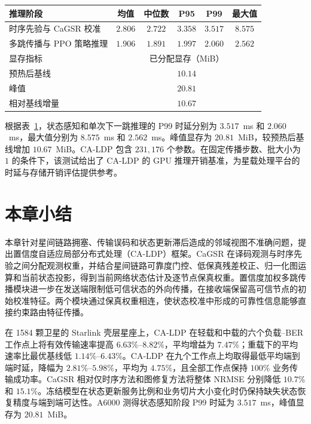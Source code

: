 \begin{table}[!htp]
\centering
{}
\label{tab:ch2_profile}
\footnotesize
\setlength{\tabcolsep}{7pt}
\renewcommand{\arraystretch}{1.14}
\begin{tabular}{lccccc}
\hline
推理阶段 & 均值 & 中位数 & P95 & P99 & 最大值 \\
\hline
时序先验与 CaGSR 校准 & $2.806$ & $2.722$ & $3.358$ & $3.517$ & $8.575$ \\
多跳传播与 PPO 策略推理 & $1.906$ & $1.891$ & $1.997$ & $2.060$ & $2.562$ \\
\hline
显存指标 & \multicolumn{5}{c}{已分配显存（MiB）} \\
\hline
预热后基线 & \multicolumn{5}{c}{$10.14$} \\
峰值 & \multicolumn{5}{c}{$20.81$} \\
相对基线增量 & \multicolumn{5}{c}{$10.67$} \\
\hline
\end{tabular}
\end{table}

根据表~\ref{tab:ch2_profile}，状态感知和单次下一跳推理的 P99 时延分别为 $3.517$~ms 和 $2.060$~ms，最大值分别为 $8.575$~ms 和 $2.562$~ms。峰值显存为 $20.81$~MiB，较预热后基线增加 $10.67$~MiB。CA-LDP 包含 $231{,}176$ 个参数。在固定传播步数、批大小为 $1$ 的条件下，该测试给出了 CA-LDP 的 GPU 推理开销基准，为星载处理平台的时延与存储开销评估提供参考。

\section{本章小结}

本章针对星间链路拥塞、传输误码和状态更新滞后造成的邻域视图不准确问题，提出置信度自适应局部分布式处理（CA-LDP）框架。CaGSR 在译码观测与时序先验之间分配观测权重，并结合星间链路可靠度门控、低保真残差校正、归一化图运算和当前状态投影，得到当前网络状态估计及逐节点保真权重。置信度加权多跳传播模块进一步在发送端限制低可信状态的外向传播，在接收端保留高可信节点的初始校准特征。两个模块通过保真权重相连，使状态校准中形成的可靠性信息能够直接约束路由特征传播。

在 1584 颗卫星的 Starlink 壳层星座上，CA-LDP 在轻载和中载的六个负载--BER 工作点上将有效传输速率提高 $6.63\%$--$8.82\%$，平均增益为 $7.47\%$；重载下的平均速率比最优基线低 $1.14\%$--$6.43\%$。CA-LDP 在九个工作点上均取得最低平均端到端时延，降幅为 $2.81\%$--$5.98\%$，平均为 $4.75\%$，且全部工作点保持 $100\%$ 业务传输成功率。CaGSR 相对仅时序方法和图修复方法将整体 NRMSE 分别降低 $10.7\%$ 和 $15.1\%$。冻结模型在状态更新服务比例和业务切片大小变化时仍保持缺失状态恢复精度与端到端可达性。A6000 测得状态感知阶段 P99 时延为 $3.517$~ms，峰值显存为 $20.81$~MiB。

